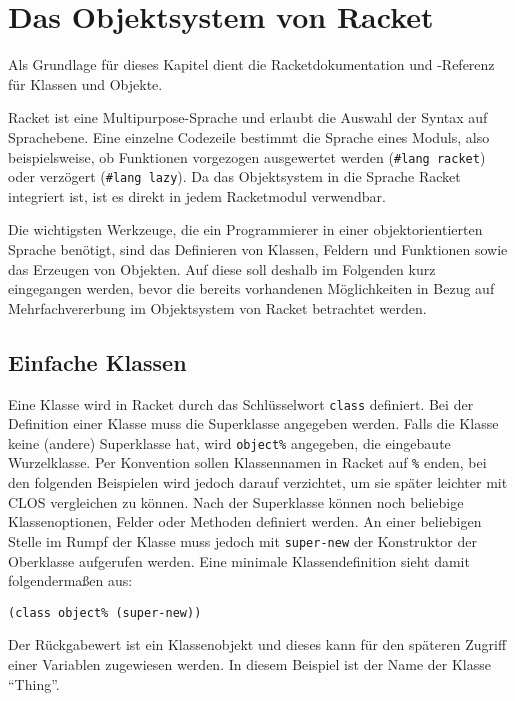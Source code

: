 \section{Das Objektsystem von Racket}
Als Grundlage für dieses Kapitel dient die Racketdokumentation \cite{racketguide-classes} und -Referenz \cite{racketref-classes} für Klassen und Objekte.

Racket ist eine Multipurpose-Sprache und erlaubt die Auswahl der Syntax auf Sprachebene. Eine einzelne Codezeile bestimmt die Sprache eines Moduls, also beispielsweise, ob Funktionen vorgezogen ausgewertet werden (\texttt{\#lang racket}) oder verzögert (\texttt{\#lang lazy}). Da das Objektsystem in die Sprache Racket integriert ist, ist es direkt in jedem Racketmodul verwendbar.

Die wichtigsten Werkzeuge, die ein Programmierer in einer objektorientierten Sprache benötigt, sind das Definieren von Klassen, Feldern und Funktionen sowie das Erzeugen von Objekten. Auf diese soll deshalb im Folgenden kurz eingegangen werden, bevor die bereits vorhandenen Möglichkeiten in Bezug auf Mehrfachvererbung im Objektsystem von Racket betrachtet werden.

\subsection{Einfache Klassen}

Eine Klasse wird in Racket durch das Schlüsselwort \texttt{class} definiert. Bei der Definition einer Klasse muss die Superklasse angegeben werden. Falls die Klasse keine (andere) Superklasse hat, wird \texttt{object\%} angegeben, die eingebaute Wurzelklasse. Per Konvention sollen Klassennamen in Racket auf \texttt{\%} enden, bei den folgenden Beispielen wird jedoch darauf verzichtet, um sie später leichter mit CLOS vergleichen zu können. Nach der Superklasse können noch beliebige Klassenoptionen, Felder oder Methoden definiert werden. An einer beliebigen Stelle im Rumpf der Klasse muss jedoch mit \texttt{super-new} der Konstruktor der Oberklasse aufgerufen werden. Eine minimale Klassendefinition sieht damit folgendermaßen aus:

\begin{lstlisting}
(class object% (super-new))
\end{lstlisting}

Der Rückgabewert ist ein Klassenobjekt und dieses kann für den späteren Zugriff einer Variablen zugewiesen werden. In diesem Beispiel ist der Name der Klasse ``Thing''.

